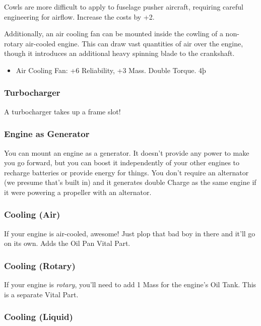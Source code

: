 \documentclass{article}
\begin{document}
Cowls are more difficult to apply to fuselage pusher aircraft,
requiring careful engineering for airflow. Increase the costs by +2.

Additionally, an air cooling fan can be mounted inside the
cowling of a non-rotary air-cooled engine. This can draw vast quantities
of air over the engine, though it introduces an additional heavy
spinning blade to the crankshaft.

\begin{itemize}
    \item          Air Cooling Fan: +6 Reliability, +3 Mass. Double Torque. 4þ
\end{itemize}

\subsubsection{Turbocharger}
\label{_Turbocharger}

A turbocharger takes up a frame slot!

\subsubsection{Engine as Generator}
\label{Engine_as_Generator}

You can mount an engine as a generator. It doesn't provide any power to
make you go forward, but you can boost it independently of your other
engines to recharge batteries or provide energy for things. You don't
require an alternator (we presume that's built in) and it generates
double Charge as the same engine if it were powering a propeller with an
alternator.

\subsubsection{Cooling (Air)}
\label{_Cooling_(Air)}

If your engine is air-cooled, awesome! Just plop that bad boy in there
and it'll go on its own. Adds the Oil Pan Vital Part.

\subsubsection{Cooling (Rotary)}
\label{_Cooling_(Rotary)}

If your engine is \emph{rotary}, you'll need to add 1 Mass for the
engine's Oil Tank. This is a separate Vital Part.

\subsubsection{Cooling (Liquid)}
\label{_Cooling_(Liquid)}
\end{document}
